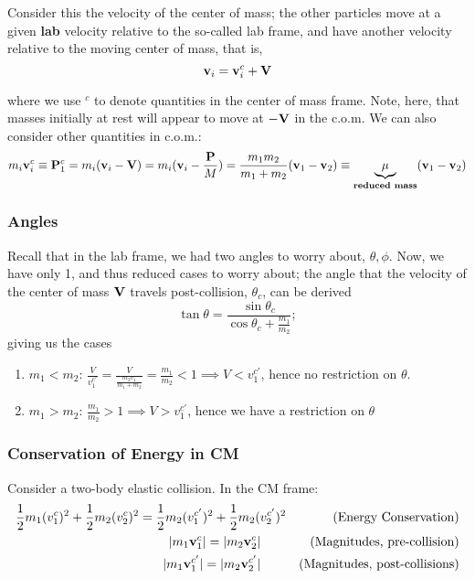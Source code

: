 \documentclass[12pt]{article}
\begin{document}
Consider this the velocity of the center of mass; the other particles move at a given \textbf{lab} velocity relative to the so-called lab frame, and have another velocity relative to the moving center of mass, that is,
\[
\vb{v}_i = \vb{v}_i^{c}  + \vb{V}
\]

where we use $^c$ to denote quantities in the center of mass frame. Note, here, that masses initially at rest will appear to move at $- \vb{V}$ in the c.o.m. We can also consider other quantities in c.o.m.:
\[
m_i \vb{v}_i^c \equiv \vb{P}_1^c = m_i(\vb{v}_i - \vb{V}) = m_i (\vb{v}_i - \frac{\vb{P}}{M}) = \frac{m_1m_2}{m_1 + m_2} (\vb{v}_1 - \vb{v}_2) \equiv \underbrace{\mu}_{\textbf{reduced mass}} (\vb{v}_1 - \vb{v}_2) 
\]

\subsubsection{Angles}
Recall that in the lab frame, we had two angles to worry about, $\theta, \phi$. Now, we have only 1, and thus reduced cases to worry about; the angle that the velocity of the center of mass $\vb{V}$ travels post-collision, $\theta_c$, can be derived \[  
  \tan \theta  = \frac{\sin \theta_c}{\cos \theta_c + \frac{m_1}{m_2}};
\]
giving us the cases 
\begin{enumerate}
  \item $m_1 < m_2$: $\frac{V}{v_1^{c'}} = \frac{V}{\frac{m_2 v_1}{m_1+m_2}} = \frac{m_1}{m_2} < 1 \implies V < v_1^{c'}$, hence no restriction on $\theta$.
  \item $m_1 > m_2$: $\frac{m_1}{m_2} > 1 \implies V > v_1^{c'}$, hence we have a restriction on $\theta$ %
\end{enumerate}

\subsubsection{Conservation of Energy in CM}
Consider a two-body elastic collision. In the CM frame:
\begin{alignat*}{2}
  \frac{1}{2}m_1 (v_1^{c})^2 + \frac{1}{2}m_2 (v_2^c)^2 = \frac{1}{2}m_2(v_1^{c'})^2 + \frac{1}{2}m_2(v_2^{c'})^2 && \qquad \text{(Energy Conservation)}\\
  |m_1 \vb{v}_1^c| = |m_2 \vb{v}_2^c| \qquad && \text{(Magnitudes, pre-collision)}\\
  |m_1 \vb{v}_1^{c'}| = |m_2 \vb{v}_2^{c'}| \qquad && \text{(Magnitudes, post-collisions)}
\end{alignat*}
\end{document}
